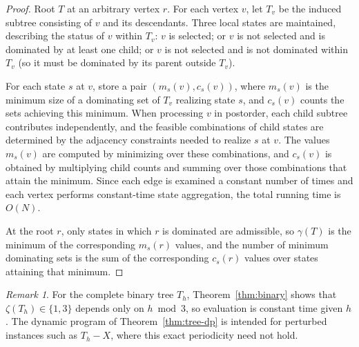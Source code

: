 \documentclass[11pt]{article}
\theoremstyle{definition}
\theoremstyle{remark}
\newtheorem{remark}[theorem]{Remark}
\begin{document}
\begin{proof}
Root $T$ at an arbitrary vertex $r$.
For each vertex $v$, let $T_v$ be the induced subtree consisting of $v$ and its descendants.
Three local states are maintained, describing the status of $v$ within $T_v$:
$v$ is selected; or $v$ is not selected and is dominated by at least one child; or $v$ is not selected
and is not dominated within $T_v$ (so it must be dominated by its parent outside $T_v$).

For each state $s$ at $v$, store a pair $(m_s(v),c_s(v))$, where $m_s(v)$ is the minimum size of a dominating
set of $T_v$ realizing state $s$, and $c_s(v)$ counts the sets achieving this minimum.
When processing $v$ in postorder, each child subtree contributes independently, and the feasible combinations
of child states are determined by the adjacency constraints needed to realize $s$ at $v$.
The values $m_s(v)$ are computed by minimizing over these combinations, and $c_s(v)$ is obtained by multiplying
child counts and summing over those combinations that attain the minimum.
Since each edge is examined a constant number of times and each vertex performs constant-time state aggregation,
the total running time is $O(N)$.

At the root $r$, only states in which $r$ is dominated are admissible, so $\gamma(T)$ is the minimum of the
corresponding $m_s(r)$ values, and the number of minimum dominating sets is the sum of the corresponding
$c_s(r)$ values over states attaining that minimum.
\end{proof}

\begin{remark}
For the complete binary tree $T_h$, Theorem~\ref{thm:binary} shows that $\zeta(T_h)\in\{1,3\}$ depends
only on $h\bmod 3$, so evaluation is constant time given $h$.
The dynamic program of Theorem~\ref{thm:tree-dp} is intended for perturbed instances such as $T_h-X$,
where this exact periodicity need not hold.
\end{remark}
\end{document}
